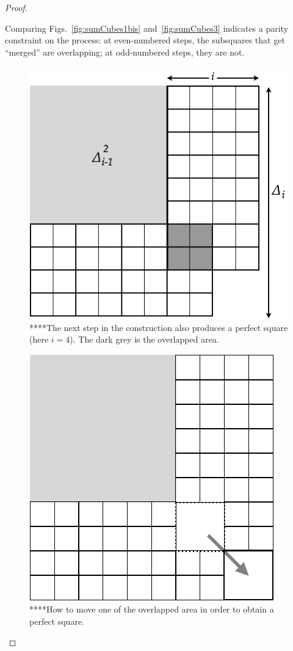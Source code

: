 \begin{proof}
\begin{description}
 Comparing Figs.~\ref{fig:sumCubes1bis}
and~\ref{fig:sumCubes3} indicates a parity constraint on the process:
at even-numbered steps, the subsquares that get ``merged'' are
overlapping; at odd-numbered steps, they are not.
\begin{figure}[ht]
\begin{center}
       \includegraphics[scale=0.4]{FiguresMaths/SumCubesEven}
\caption{****The next step in the construction also produces a perfect square (here $i=4$).
The dark grey is the overlapped area.}
       \label{fig:sumCubesEven}
\end{center}
\end{figure}
\begin{figure}[ht]
\begin{center}
       \includegraphics[scale=0.4]{FiguresMaths/SumCubesEvenFinal}
\caption{****How to move one of the overlapped area in order to obtain a perfect square.}
       \label{fig:sumCubesEvenFinal}
\end{center}
\end{figure}


\end{description}
\end{proof}
